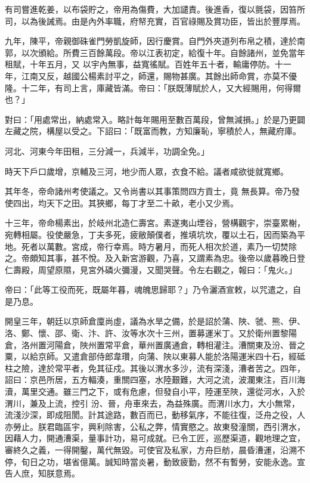 \begin{pinyinscope}
 有司嘗進乾姜，以布袋貯之，帝用為傷費，大加譴責。後進香，復以氈袋，因笞所司，以為後誡焉。由是內外率職，府帑充實，百官祿賜及賞功臣，皆出於豐厚焉。



 九年，陳平，帝親御硃雀門勞凱旋師，因行慶賞。自門外夾道列布帛之積，達於南郭，以次頒給。所費三百餘萬段。帝以江表初定，給復十年。自餘諸州，並免當年租賦，十年五月，又
 以宇內無事，益寬徭賦。百姓年五十者，輸庸停防。十一年，江南又反，越國公楊素討平之，師還，賜物甚廣。其餘出師命賞，亦莫不優隆。十二年，有司上言，庫藏皆滿。帝曰：「朕既薄賦於人，又大經賜用，何得爾也？」



 對曰：「用處常出，納處常入。略計每年賜用至數百萬段，曾無減損。」於是乃更闢左藏之院，構屋以受之。下詔曰：「既富而教，方知廉恥，寧積於人，無藏府庫。



 河北、河東今年田租，三分減一，兵減半，功調全免。」



 時天下戶口歲增，京輔及三河，地少而人眾，衣食不給。議者咸欲徙就寬鄉。



 其年冬，帝命諸州考使議之。又令尚書以其事策問四方貢士，竟
 無長算。帝乃發使四出，均天下之田。其狹鄉，每丁才至二十畝，老小又少焉。



 十三年，帝命楊素出，於岐州北造仁壽宮。素遂夷山堙谷，營構觀宇，崇臺累榭，宛轉相屬。役使嚴急，丁夫多死，疲敝顛僕者，推填坑坎，覆以土石，因而築為平地。死者以萬數。宮成，帝行幸焉。時方暑月，而死人相次於道，素乃一切焚除之。帝頗知其事，甚不悅。及入新宮游觀，乃喜，又謂素為忠。後帝以歲暮晚日登仁壽殿，周望原隰，見宮外磷火彌漫，又聞哭聲。令左右觀之，報曰：「鬼火。」



 帝曰：「此等工役而死，既屬年暮，魂魄思歸耶？」乃令灑酒宣敕，以咒遣之，自是乃息。



 開皇三年，朝廷以京師倉廩尚虛，議為水旱之備，於是詔於蒲、陜、虢、熊、伊、洛、鄭、懷、邵、衛、汴、許、汝等水次十三州，置募運米丁。又於衛州置黎陽倉，洛州置河陽倉，陜州置常平倉，華州置廣通倉，轉相灌注。漕關東及汾、晉之粟，以給京師。又遣倉部侍郎韋瓚，向蒲、陜以東募人能於洛陽運米四十石，經砥柱之險，達於常平者，免其征戍。其後以渭水多沙，流有深淺，漕者苦之。四年，詔曰：京邑所居，五方輻湊，重關四塞，水陸艱難，大河之流，波瀾東注，百川海瀆，萬里交通。雖三門之下，或有危慮，但發自小平，陸運至陜，還從河水，入於渭川，兼及上流，控引
 汾、晉，舟車來去，為益殊廣。而渭川水力，大小無常，流淺沙深，即成阻閡。計其途路，數百而已，動移氣序，不能往復，泛舟之役，人亦勞止。朕君臨區宇，興利除害，公私之弊，情實愍之。故東發潼關，西引渭水，因藉人力，開通漕渠，量事計功，易可成就。已令工匠，巡歷渠道，觀地理之宜，審終久之義，一得開鑿，萬代無毀。可使官及私家，方舟巨舫，晨昏漕運，沿溯不停，旬日之功，堪省億萬。誠知時當炎暑，動致疲勤，然不有暫勞，安能永逸。宣告人庶，知朕意焉。




\end{pinyinscope}
